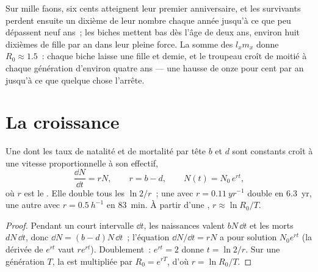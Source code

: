 \begin{example}\label{ex:b1:populations:deer}
Sur mille faons, six cents atteignent leur premier anniversaire, et les
survivants perdent ensuite un dixième de leur nombre chaque année
jusqu'à ce que peu dépassent neuf ans~; les biches mettent bas dès l'âge
de deux ans, environ huit dixièmes de fille par an dans leur pleine
force. La somme des $l_x m_x$ donne $R_0 \approx 1.5$~: chaque biche
laisse une fille et demie, et le troupeau croît de moitié à chaque
génération d'environ quatre ans --- une hausse de onze pour cent par an
jusqu'à ce que quelque chose l'arrête.
\end{example}

\section{La croissance}

\begin{theorem}\label{thm:b1:populations:exponential}
Une  dont les taux de natalité et de mortalité par tête $b$
et $d$ sont constants croît à une vitesse proportionnelle à son effectif,
\[
\frac{\dd N}{\dd t} = rN, \qquad r = b - d, \qquad N(t) = N_0\,e^{rt},
\]
où $r$ est le \emph{}. Elle double
tous les $\ln 2/r$~; une  avec $r = \qty{0.11}{yr^{-1}}$
double en \qty{6.3}{yr}, une autre avec $r = \qty{0.5}{h^{-1}}$ en
\qty{83}{min}. À partir d'une , $r \approx \ln R_0 / T$.
\end{theorem}
\begin{proof}
Pendant un court intervalle $\dd t$, les naissances valent
$bN\,\dd t$ et les morts
$dN\,\dd t$, donc $\dd N = (b - d)N\,\dd t$~; l'équation
$\dd N/\dd t = rN$ a pour solution $N_0 e^{rt}$ (la dérivée de
$e^{rt}$ vaut $re^{rt}$). Doublement~: $e^{rt} = 2$ donne $t = \ln 2/r$.
Sur une génération $T$, la  est multipliée par $R_0 = e^{rT}$,
d'où $r = \ln R_0/T$.
\end{proof}

